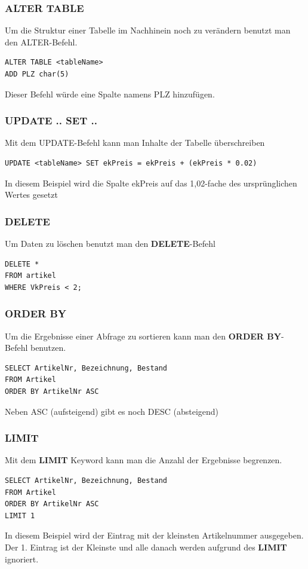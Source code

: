 \documentclass[10pt]{article}
\begin{document}
\subsubsection{ALTER TABLE}
Um die Struktur einer Tabelle  im Nachhinein noch  zu  verändern  benutzt  man den ALTER-Befehl.
\begin{lstlisting}
ALTER TABLE <tableName>
ADD PLZ char(5)
\end{lstlisting}
Dieser Befehl  würde  eine Spalte  namens  PLZ  hinzufügen.

\subsubsection{UPDATE .. SET ..}

Mit dem UPDATE-Befehl kann man Inhalte der Tabelle überschreiben
\begin{lstlisting}
UPDATE <tableName> SET ekPreis = ekPreis + (ekPreis * 0.02)
\end{lstlisting}
In diesem Beispiel wird die Spalte ekPreis auf das 1,02-fache des ursprünglichen Wertes gesetzt

\subsubsection{DELETE}
Um Daten zu löschen benutzt man den \textbf{DELETE}-Befehl
\begin{lstlisting}
DELETE *
FROM artikel
WHERE VkPreis < 2;
\end{lstlisting}

\subsubsection{ORDER BY}
Um die Ergebnisse einer Abfrage zu sortieren kann man den \textbf{ORDER BY}-Befehl  benutzen.
\begin{lstlisting}
SELECT ArtikelNr, Bezeichnung, Bestand 
FROM Artikel
ORDER BY ArtikelNr ASC
\end{lstlisting}
Neben ASC (aufsteigend)  gibt es noch DESC (absteigend)

\subsubsection{LIMIT}
Mit dem \textbf{LIMIT} Keyword kann man die Anzahl der Ergebnisse begrenzen.
\begin{lstlisting}
SELECT ArtikelNr, Bezeichnung, Bestand 
FROM Artikel
ORDER BY ArtikelNr ASC
LIMIT 1
\end{lstlisting}
In diesem  Beispiel wird der Eintrag mit der kleinsten Artikelnummer ausgegeben. \\
Der 1. Eintrag  ist der  Kleinste  und alle danach werden aufgrund des \textbf{LIMIT} ignoriert.
\end{document}
